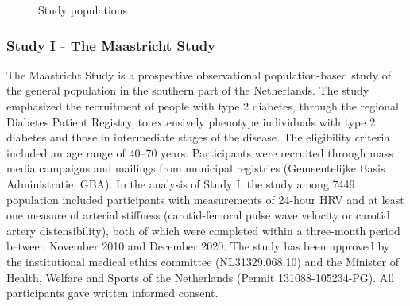 \documentclass[
  a4paper,
  headsepline=true,
  open=any]{scrbook}
\begin{document}
\begin{figure}

\begin{minipage}[t]{\linewidth}

{\centering 


\caption{Study populations}

}

\end{minipage}%

\end{figure}

\hypertarget{study-i---the-maastricht-study}{%
\subsubsection{Study I - The Maastricht
Study}\label{study-i---the-maastricht-study}}

The Maastricht Study is a prospective observational population-based
study of the general population in the southern part of the Netherlands.
The study emphasized the recruitment of people with type 2 diabetes,
through the regional Diabetes Patient Registry, to extensively phenotype
individuals with type 2 diabetes and those in intermediate stages of the
disease. The eligibility criteria included an age range of 40--70 years.
Participants were recruited through mass media campaigns and mailings
from municipal registries (Gemeentelijke Basis Administratie; GBA). In
the analysis of Study I, the study among 7449 population included
participants with measurements of 24-hour HRV and at least one measure
of arterial stiffness (carotid-femoral pulse wave velocity or carotid
artery distensibility), both of which were completed within a
three-month period between November 2010 and December 2020. The study
has been approved by the institutional medical ethics committee
(NL31329.068.10) and the Minister of Health, Welfare and Sports of the
Netherlands (Permit 131088-105234-PG). All participants gave written
informed consent.
\end{document}
